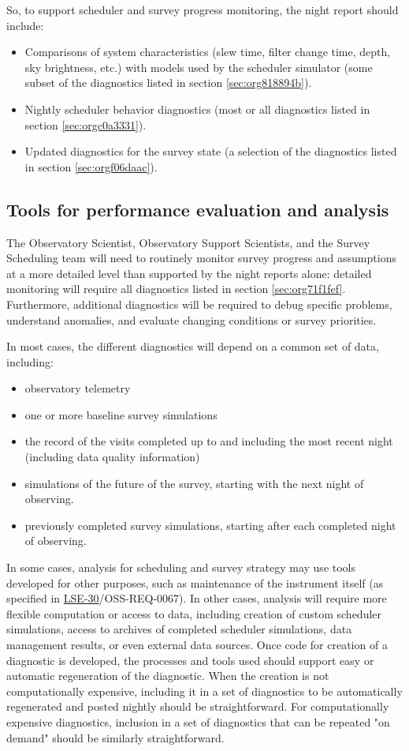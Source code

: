 So, to support scheduler and survey progress monitoring, the night report should include:
\begin{itemize}
\item Comparisons of system characteristics (slew time, filter change time, depth, sky brightness, etc.) with models used by the scheduler simulator (some subset of the diagnostics listed in section \ref{sec:org818894b}).
\item Nightly scheduler behavior diagnostics (most or all diagnostics listed in section \ref{sec:orgc0a3331}).
\item Updated diagnostics for the survey state (a selection of the diagnostics listed in section \ref{sec:orgf06daac}).
\end{itemize}

\subsection{Tools for performance evaluation and analysis}
\label{sec:org7ebf85f}
The Observatory Scientist, Observatory Support Scientists, and the Survey Scheduling team will need to routinely monitor survey progress and assumptions at a more detailed level than supported by the night reports alone:
detailed monitoring will require all diagnostics listed in section \ref{sec:org71f1fef}.
Furthermore, additional diagnostics will be required to debug specific problems, understand anomalies, and evaluate changing conditions or survey priorities.

In most cases, the different diagnostics will depend on a common set of data, including:
\begin{itemize}
\item observatory telemetry
\item one or more baseline survey simulations
\item the record of the visits completed up to and including the most recent night (including data quality information)
\item simulations of the future of the survey, starting with the next night of observing.
\item previously completed survey simulations, starting after each completed night of observing.
\end{itemize}

In some cases, analysis for scheduling and survey strategy may use tools developed for other purposes, such as maintenance of the instrument itself (as specified in \href{https://ls.st/lse-30}{LSE-30}/OSS-REQ-0067).
In other cases, analysis will require more flexible computation or access to data, including creation of custom scheduler simulations, access to archives of completed scheduler simulations, data management results, or even external data sources.
Once code for creation of a diagnostic is developed, the processes and tools used should support easy or automatic regeneration of the diagnostic.
When the creation is not computationally expensive, including it in a set of diagnostics to be automatically regenerated and posted nightly should be straightforward.
For computationally expensive diagnostics, inclusion in a set of diagnostics that can be repeated "on demand" should be similarly straightforward.

